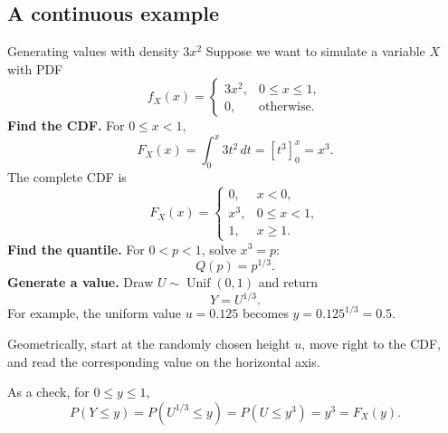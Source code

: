 \documentclass[a4paper,12pt,oneside]{report}
\begin{document}
\subsection{A continuous example}
\begin{framedexample}{Generating values with density $3x^2$}
Suppose we want to simulate a variable $X$ with PDF
\[
  f_X(x)=
  \begin{cases}
    3x^2, & 0\leq x\leq1,\\
    0, & \text{otherwise}.
  \end{cases}
\]
\textbf{Find the CDF.} For $0\leq x<1$,
\[
  F_X(x)=\int_0^x3t^2\,dt=[t^3]_0^x=x^3.
\]
The complete CDF is
\[
  F_X(x)=
  \begin{cases}
    0, & x<0,\\
    x^3, & 0\leq x<1,\\
    1, & x\geq1.
  \end{cases}
\]
\textbf{Find the quantile.} For $0<p<1$, solve $x^3=p$:
\[
  Q(p)=p^{1/3}.
\]
\textbf{Generate a value.} Draw $U\sim\operatorname{Unif}(0,1)$
and return
\[
  \boxed{Y=U^{1/3}.}
\]
For example, the uniform value $u=0.125$ becomes
$y=0.125^{1/3}=0.5$.

\begin{center}
\end{center}
Geometrically, start at the randomly chosen height $u$, move right
to the CDF, and read the corresponding value on the horizontal axis.

As a check, for $0\leq y\leq1$,
\[
  P(Y\leq y)=P(U^{1/3}\leq y)=P(U\leq y^3)=y^3=F_X(y).
\]
\end{framedexample}

\clearpage
\end{document}
